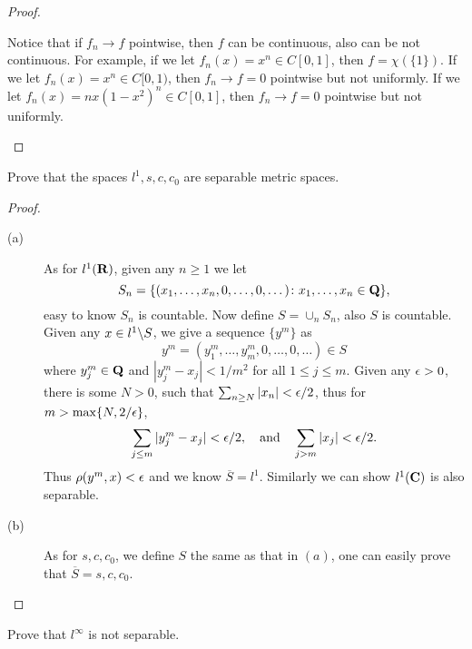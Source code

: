 \begin{proof}
\begin{description}
	Notice that if $f_n\to f$ pointwise, then $f$ can be continuous, also can be not continuous. For example, if we let $f_n(x)=x^n\in C[0,1]$, then $f=\chi(\{1\})$. If we let $f_n(x)=x^n\in C[0,1)$, then $f_n\to f=0$ pointwise but not uniformly. If we let $f_n(x)=nx(1-x^2)^n\in C[0,1]$, then $f_n\to f=0$ pointwise but not uniformly.
	\end{description}
\end{proof}

\begin{pro}%
	Prove that the spaces $l^1,s,c,c_0$ are separable metric spaces.
\end{pro}
\begin{proof}
	\begin{description}
	\item[(a)] As for $l^1(\mathbf{R})$, given any $n\geq 1$ we let 
	\[S_n=\{(x_1,\dots,x_n,0,\dots,0,\dots)\colon x_1,\dots,x_n\in \mathbf{Q}\},\]
	easy to know $S_n$ is countable. Now define $S=\cup_n S_n$, also $S$ is countable. Given any $x\in l^1\backslash S$, we give a sequence $\{y^m\}$ as
	\[y^m=(y_1^m,\dots,y_m^m,0,\dots,0,\dots)\in S\]
	where $y_j^m\in \mathbf{Q}$ and $|y_j^m-x_j|< 1/m^2$ for all $1\leq j\leq m$. Given any $\epsilon>0$, there is some $N>0$, such that $\sum_{n\geq N}|x_n|<\epsilon/2$, thus for $m>\max\{N,2/\epsilon\}$, 
	\[\sum_{j\leq m} |y_j^m-x_j|<\epsilon/2,\quad\mbox{and}\quad \sum_{j>m} |x_j|<\epsilon/2.\]
	Thus $\rho(y^m,x)<\epsilon$ and we know $\overline{S}=l^1$. Similarly we can show $l^1(\mathbf{C})$ is also separable.
	\item[(b)] As for $s,c,c_0$, we define $S$ the same as that in $(a)$, one can easily prove that $\overline{S}=s,c,c_0$.
	\end{description}
\end{proof}

\begin{pro}%
	Prove that $l^\infty$ is not separable.
\end{pro}

